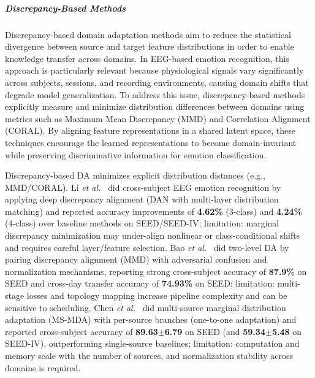 \documentclass{WileyMSP-template}
\begin{document}
\subparagraph{Discrepancy-Based Methods}
Discrepancy-based domain adaptation methods aim to reduce the statistical divergence between source and target feature distributions in order to enable knowledge transfer across domains. In EEG-based emotion recognition, this approach is particularly relevant because physiological signals vary significantly across subjects, sessions, and recording environments, causing domain shifts that degrade model generalization. To address this issue, discrepancy-based methods explicitly measure and minimize distribution differences between domains using metrics such as Maximum Mean Discrepancy (MMD) and Correlation Alignment (CORAL). By aligning feature representations in a shared latent space, these techniques encourage the learned representations to become domain-invariant while preserving discriminative information for emotion classification.

Discrepancy-based DA minimizes explicit distribution distances (e.g., MMD/CORAL). Li \textit{et al.}~\cite{li2018iconip_dan} did cross-subject EEG emotion recognition by applying deep discrepancy alignment (DAN with multi-layer distribution matching) and reported accuracy improvements of \textbf{4.62\%} (3-class) and \textbf{4.24\%} (4-class) over baseline methods on SEED/SEED-IV; limitation: marginal discrepancy minimization may under-align nonlinear or class-conditional shifts and requires careful layer/feature selection. Bao \textit{et al.}~\cite{bao2021frontiers_tdann} did two-level DA by pairing discrepancy alignment (MMD) with adversarial confusion and normalization mechanisms, reporting strong cross-subject accuracy of \textbf{87.9\%} on SEED and cross-day transfer accuracy of \textbf{74.93\%} on SEED; limitation: multi-stage losses and topology mapping increase pipeline complexity and can be sensitive to scheduling. Chen \textit{et al.}~\cite{chen2021frontiers_msmda} did multi-source marginal distribution adaptation (MS-MDA) with per-source branches (one-to-one adaptation) and reported cross-subject accuracy of \textbf{89.63$\pm$6.79} on SEED (and \textbf{59.34$\pm$5.48} on SEED-IV), outperforming single-source baselines; limitation: computation and memory scale with the number of sources, and normalization stability across domains is required.
\end{document}
